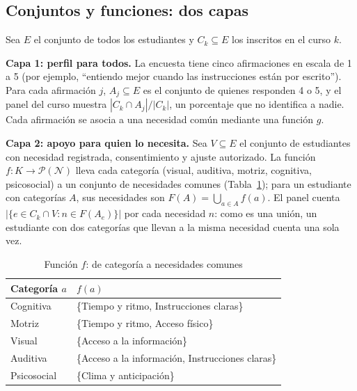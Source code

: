 \documentclass[12pt,letterpaper]{article}
\begin{document}
\subsection{Conjuntos y funciones: dos capas}
Sea $E$ el conjunto de todos los estudiantes y $C_k \subseteq E$ los inscritos en el curso $k$.

\textbf{Capa 1: perfil para todos.} La encuesta tiene cinco afirmaciones en escala de 1 a 5 (por ejemplo, ``entiendo mejor cuando las instrucciones están por escrito''). Para cada afirmación $j$, $A_j \subseteq E$ es el conjunto de quienes responden 4 o 5, y el panel del curso muestra $|C_k \cap A_j| / |C_k|$, un porcentaje que no identifica a nadie. Cada afirmación se asocia a una necesidad común mediante una función $g$.

\textbf{Capa 2: apoyo para quien lo necesita.} Sea $V \subseteq E$ el conjunto de estudiantes con necesidad registrada, consentimiento y ajuste autorizado. La función $f: K \to \mathcal{P}(\mathcal{N})$ lleva cada categoría (visual, auditiva, motriz, cognitiva, psicosocial) a un conjunto de necesidades comunes (Tabla~\ref{tab:funcion}); para un estudiante con categorías $A$, sus necesidades son $F(A)=\bigcup_{a\in A} f(a)$. El panel cuenta $|\{e \in C_k \cap V : n \in F(A_e)\}|$ por cada necesidad $n$: como es una unión, un estudiante con dos categorías que llevan a la misma necesidad cuenta una sola vez.

\begin{table}[H]
\centering
\caption{Función $f$: de categoría a necesidades comunes}
\label{tab:funcion}
\small
\begin{tabular}{ll}
\toprule
Categoría $a$ & $f(a)$ \\
\midrule
Cognitiva & \{Tiempo y ritmo, Instrucciones claras\} \\
Motriz & \{Tiempo y ritmo, Acceso físico\} \\
Visual & \{Acceso a la información\} \\
Auditiva & \{Acceso a la información, Instrucciones claras\} \\
Psicosocial & \{Clima y anticipación\} \\
\bottomrule
\end{tabular}
\end{table}
\end{document}
